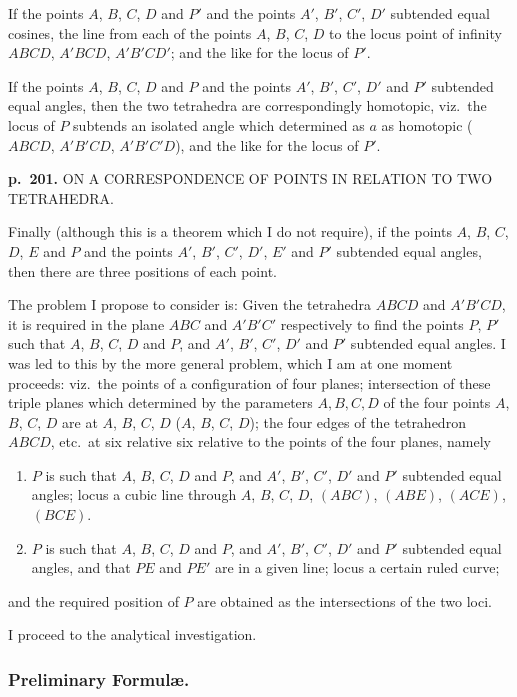 \documentclass[11pt,a4paper]{book}
\begin{document}
If the points $A$, $B$, $C$, $D$ and $P'$ and the points $A'$, $B'$, $C'$, $D'$ subtended equal cosines, the line from each of the points $A$, $B$, $C$, $D$ to the locus point of infinity $ABCD$, $A'BCD$, $A'B'CD'$; and the like for the locus of $P'$.

If the points $A$, $B$, $C$, $D$ and $P$ and the points $A'$, $B'$, $C'$, $D'$ and $P'$ subtended equal angles, then the two tetrahedra are correspondingly homotopic, viz.\ the locus of $P$ subtends an isolated angle which determined as $a$ as homotopic ($ABCD$, $A'B'CD$, $A'B'C'D$), and the like for the locus of $P'$.

\clearpage

\noindent
\textbf{p.~201.}  ON A CORRESPONDENCE OF POINTS IN RELATION TO TWO TETRAHEDRA.

Finally (although this is a theorem which I do not require), if the points $A$, $B$, $C$, $D$, $E$ and $P$ and the points $A'$, $B'$, $C'$, $D'$, $E'$ and $P'$ subtended equal angles, then there are three positions of each point.

The problem I propose to consider is: Given the tetrahedra $ABCD$ and $A'B'CD$, it is required in the plane $ABC$ and $A'B'C'$ respectively to find the points $P$, $P'$ such that $A$, $B$, $C$, $D$ and $P$, and $A'$, $B'$, $C'$, $D'$ and $P'$ subtended equal angles. I was led to this by the more general problem, which I am at one moment proceeds: viz.\ the points of a configuration of four planes; intersection of these triple planes which determined by the parameters $A, B, C, D$ of the four points $A$, $B$, $C$, $D$ are at $A$, $B$, $C$, $D$ ($A$, $B$, $C$, $D$); the four edges of the tetrahedron $ABCD$, etc.\ at six relative six relative to the points of the four planes, namely
\begin{enumerate}[label=\arabic*.]
\item $P$ is such that $A$, $B$, $C$, $D$ and $P$, and $A'$, $B'$, $C'$, $D'$ and $P'$ subtended equal angles; locus a cubic line through $A$, $B$, $C$, $D$, $(ABC)$, $(ABE)$, $(ACE)$, $(BCE)$.
\item $P$ is such that $A$, $B$, $C$, $D$ and $P$, and $A'$, $B'$, $C'$, $D'$ and $P'$ subtended equal angles, and that $PE$ and $PE'$ are in a given line; locus a certain ruled curve;
\end{enumerate}
and the required position of $P$ are obtained as the intersections of the two loci.

I proceed to the analytical investigation.

\subsubsection*{Preliminary Formul\ae.}
\end{document}

